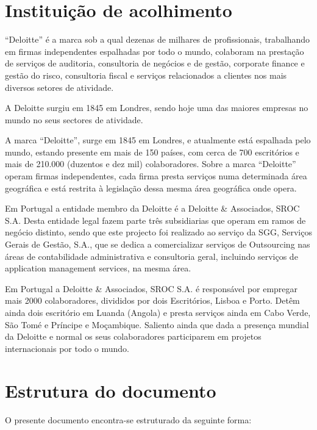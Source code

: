 \section{Instituição de acolhimento}

\par “Deloitte” é a marca sob a qual dezenas de milhares de profissionais, trabalhando em firmas independentes espalhadas por todo o mundo, colaboram na prestação de serviços de auditoria, consultoria de negócios e de gestão, corporate finance e gestão do risco, consultoria fiscal e serviços relacionados a clientes nos mais diversos setores de atividade.
\par A Deloitte surgiu em 1845 em Londres, sendo hoje uma das maiores empresas no mundo no seus sectores de atividade.
\par A marca “Deloitte”, surge em 1845 em Londres, e atualmente está espalhada pelo mundo, estando presente em mais de 150 países, com cerca de 700 escritórios e mais de 210.000 (duzentos e dez mil) colaboradores. Sobre a marca “Deloitte” operam firmas independentes, cada firma presta serviços numa determinada área geográfica e está restrita à legislação dessa mesma área geográfica onde opera.
\par Em Portugal a entidade membro da Deloitte é a Deloitte \& Associados, SROC S.A. Desta entidade legal fazem parte três subsidiarias que operam em ramos de negócio distinto, sendo que este projecto foi realizado ao serviço da SGG, Serviços Gerais de Gestão, S.A., que se dedica a comercializar serviços de Outsourcing nas áreas de contabilidade administrativa e consultoria geral, incluindo serviços de application management services,  na mesma área.
\par Em Portugal a Deloitte \& Associados, SROC S.A. é responsável por empregar mais  2000 colaboradores, divididos por dois Escritórios, Lisboa e Porto. Detêm ainda dois escritório em Luanda (Angola) e presta serviços ainda em Cabo Verde, São Tomé e Príncipe e Moçambique. Saliento ainda que dada a presença mundial da Deloitte e normal os seus colaboradores participarem em projetos internacionais por todo o mundo.


\section{Estrutura do documento}
\par O presente documento encontra-se estruturado da seguinte forma:

